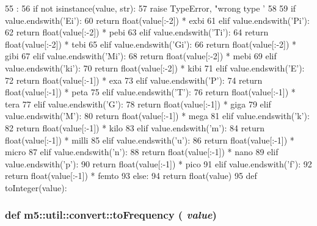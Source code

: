\begin{DoxyCode}
55                   :
56     if not isinstance(value, str):
57         raise TypeError, "wrong type '%
58 
59     if value.endswith('Ei'):
60         return float(value[:-2]) * exbi
61     elif value.endswith('Pi'):
62         return float(value[:-2]) * pebi
63     elif value.endswith('Ti'):
64         return float(value[:-2]) * tebi
65     elif value.endswith('Gi'):
66         return float(value[:-2]) * gibi
67     elif value.endswith('Mi'):
68         return float(value[:-2]) * mebi
69     elif value.endswith('ki'):
70         return float(value[:-2]) * kibi
71     elif value.endswith('E'):
72         return float(value[:-1]) * exa
73     elif value.endswith('P'):
74         return float(value[:-1]) * peta
75     elif value.endswith('T'):
76         return float(value[:-1]) * tera
77     elif value.endswith('G'):
78         return float(value[:-1]) * giga
79     elif value.endswith('M'):
80         return float(value[:-1]) * mega
81     elif value.endswith('k'):
82         return float(value[:-1]) * kilo
83     elif value.endswith('m'):
84         return float(value[:-1]) * milli
85     elif value.endswith('u'):
86         return float(value[:-1]) * micro
87     elif value.endswith('n'):
88         return float(value[:-1]) * nano
89     elif value.endswith('p'):
90         return float(value[:-1]) * pico
91     elif value.endswith('f'):
92         return float(value[:-1]) * femto
93     else:
94         return float(value)
95 
def toInteger(value):
\end{DoxyCode}
\hypertarget{namespacem5_1_1util_1_1convert_ac776d14f4466b6a5290902462b775c87}{
\subsubsection[{toFrequency}]{\setlength{\rightskip}{0pt plus 5cm}def m5::util::convert::toFrequency ( {\em value})}}
\label{namespacem5_1_1util_1_1convert_ac776d14f4466b6a5290902462b775c87}



